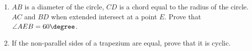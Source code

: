\begin{enumerate}[label=\thesubsection.\arabic*,ref=\thesubsection.\theenumi]
\item $AB$ is a diameter of the circle, $CD$ is a chord equal to the radius of the circle. $AC$ and $BD$ when extended intersect at a point $E$. Prove that $\angle AEB = 60\degree$.
\item If the non-parallel sides of a trapezium are equal, prove that it is cyclic.
\end{enumerate}
